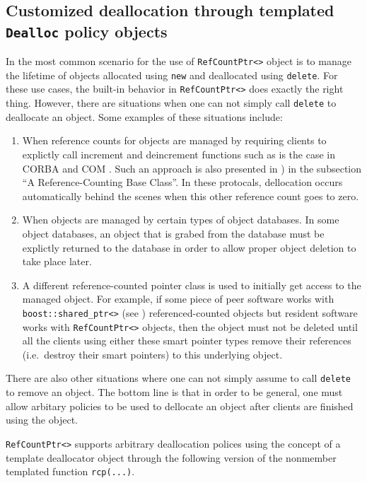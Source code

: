 %
\subsection{Customized deallocation through templated {}\texttt{Dealloc} policy objects}
\label{rcp:sec:dealloc}
%

In the most common scenario for the use of {}\texttt{RefCountPtr<>}
object is to manage the lifetime of objects allocated using
{}\texttt{new} and deallocated using {}\texttt{delete}.  For these use
cases, the built-in behavior in {}\texttt{RefCountPtr<>} does exactly
the right thing.  However, there are situations when one can not
simply call {}\texttt{delete} to deallocate an object.  Some examples
of these situations include:
%
\begin{enumerate}
\item
When reference counts for objects are managed by requiring clients to
explictly call increment and deincrement functions such as is the case
in CORBA {}\cite{ref:corba} and COM {}\cite{ref:com}.  Such an
approach is also presented in {}\cite[Item 29]{ref:meyers_1996}) in
the subsection ``A Reference-Counting Base Class''.  In these
protocals, dellocation occurs automatically behind the scenes when
this other reference count goes to zero.
\item
When objects are managed by certain types of object databases.  In
some object databases, an object that is grabed from the database must
be explictly returned to the database in order to allow proper object
deletion to take place later.
\item
A different reference-counted pointer class is used to initially get
access to the managed object.  For example, if some piece of peer
software works with {}\texttt{boost::shared\_ptr<>} (see
{}\cite{ref:boost}) referenced-counted objects but resident software
works with {}\texttt{RefCountPtr<>} objects, then the object must not
be deleted until all the clients using either these smart pointer
types remove their references (i.e.~destroy their smart pointers) to
this underlying object.
\end{enumerate}
%
There are also other situations where one can not simply assume to call
{}\texttt{delete} to remove an object.  The bottom line is that in order
to be general, one must allow arbitary policies to be used to
dellocate an object after clients are finished using the object.

{}\texttt{RefCountPtr<>} supports arbitrary deallocation polices using
the concept of a template deallocator object through the following
version of the nonmember templated function {}\texttt{rcp(...)}.

